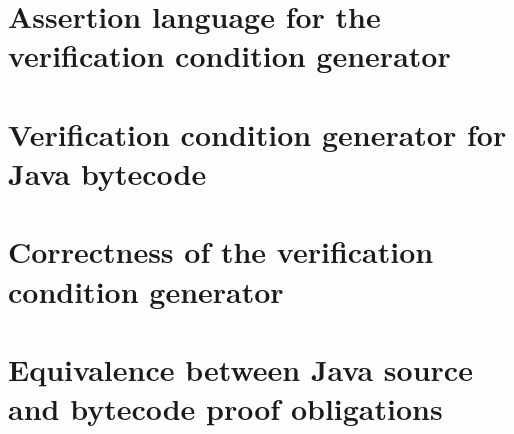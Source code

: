 \documentclass[book,10pt]{book}
\begin{document}
\chapter{Assertion language for the verification condition generator}\label{assertLang}
  
  
  
  
   


\chapter{Verification condition generator for Java bytecode } \label{wpGeneral}
    
   
  
   
  
  
  
   
  

\chapter{Correctness of the verification condition generator}\label{proofGeneral}
  
   
  
  
  



\chapter{Equivalence between Java source and bytecode proof obligations}\label{pogEquiv}
  
 
 
   
	 
  
   
  


\end{document}
